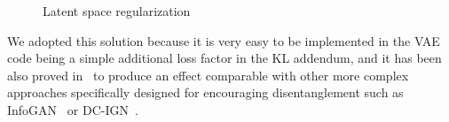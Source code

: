 \begin{figure}
    \centering
    \caption{ Latent space regularization } 
    \label{fig:step1_ls_regularization}
\end{figure}
%
We adopted this solution because it is very easy to be implemented in the \acs{VAE} code being a simple additional loss factor in the KL addendum, and it has been also proved in~\cite{Higgins2017betaVAELB} to produce an effect comparable with other more complex approaches specifically designed for encouraging disentanglement such as InfoGAN~\cite{NIPS2016_6399} or DC-IGN~\cite{kulkarni2015deep}. 
